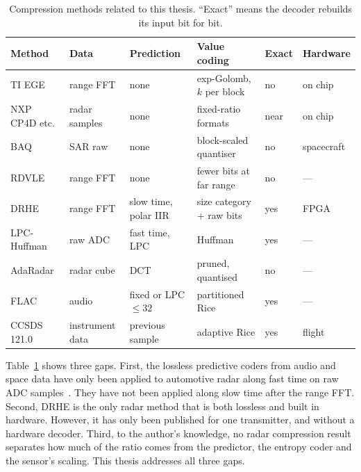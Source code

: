\begin{table}[H]
\centering
\caption[Related compression methods]{Compression methods related to this
thesis. ``Exact'' means the decoder rebuilds its input bit for bit.}
\label{tab:relwork}
\small
\setlength{\tabcolsep}{3pt}
\renewcommand{\arraystretch}{1.12}
\begin{tabular}{>{\raggedright}p{}|>{\raggedright}p{}|>{\raggedright}p{}|>{\raggedright}p{}|l|>{\raggedright\arraybackslash}p{}}
\textbf{Method} & \textbf{Data} & \textbf{Prediction} & \textbf{Value coding} & \textbf{Exact} & \textbf{Hardware}\\
\hline
TI EGE \cite{ti_ege} & range FFT & none & exp-Golomb, $k$ per block & no & on chip\\
NXP CP4D etc.\ \cite{nxp_an5375} & radar samples & none & fixed-ratio formats & near & on chip\\
BAQ \cite{kwok1989} & SAR raw & none & block-scaled quantiser & no & spacecraft\\
RDVLE \cite{li2014} & range FFT & none & fewer bits at far range & no & ---\\
DRHE \cite{li2014,kiem2025} & range FFT & slow time, polar IIR & size category + raw bits & yes & FPGA \cite{kiem2025}\\
LPC-Huffman \cite{meucci2022} & raw ADC & fast time, LPC & Huffman & yes & ---\\
AdaRadar \cite{park2026} & radar cube & DCT & pruned, quantised & no & ---\\
FLAC \cite{rfc9639} & audio & fixed or LPC $\le 32$ & partitioned Rice & yes & ---\\
CCSDS 121.0 \cite{ccsds121} & instrument data & previous sample & adaptive Rice & yes & flight\\
\end{tabular}
\end{table}

Table~\ref{tab:relwork} shows three gaps. First, the lossless predictive
coders from audio and space data have only been applied to automotive radar
along fast time on raw ADC samples~\cite{meucci2022}. They have not been
applied along slow time after the range FFT. Second, DRHE is the only radar
method that is both lossless and built in hardware. However, it has only been
published for one transmitter, and without a hardware decoder. Third, to the
author's knowledge, no radar compression result separates how much of the
ratio comes from the predictor, the entropy coder and the sensor's scaling.
This thesis addresses all three gaps.

